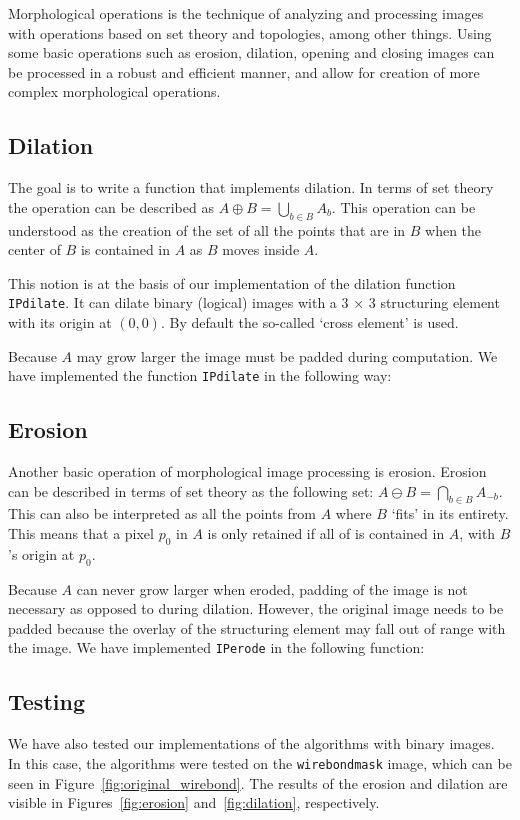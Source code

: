 Morphological operations is the technique of analyzing and processing images with operations based on set theory and topologies, among other things.
Using some basic operations such as erosion, dilation, opening and closing images can be processed in a robust and efficient manner, and allow for creation of more complex morphological operations.

\subsection{Dilation}
The goal is to write a function that implements dilation.
In terms of set theory the operation can be described as \(A \oplus B = \underset{b \in B}\bigcup A_b\).
This operation can be understood as the creation of the set of all the points that are in \(B\) when the center of \(B\) is contained in \(A\) as \(B\) moves inside \(A\).

This notion is at the basis of our implementation of the dilation function \texttt{IPdilate}.
It can dilate binary (logical) images with a 3 \(\times\) 3 structuring element with its origin at \((0, 0)\).
By default the so-called `cross element' is used.

Because \(A\) may grow larger the image must be padded during computation.
We have implemented the function \texttt{IPdilate} in the following way:
\subsection{Erosion}
Another basic operation of morphological image processing is erosion.
Erosion can be described in terms of set theory as the following set: \(A \ominus B = \underset{b \in B}\bigcap A_{-b}\).
This can also be interpreted as all the points from \(A\) where \(B\) `fits' in its entirety.
This means that a pixel \(p_0\) in \(A\) is only retained if all of is contained in \(A\), with \(B\)'s origin at \(p_0\).

Because \(A\) can never grow larger when eroded, padding of the image is not necessary as opposed to during dilation.
However, the original image needs to be padded because the overlay of the structuring element may fall out of range with the image.
We have implemented \texttt{IPerode} in the following function:
\clearpage
\subsection{Testing}
We have also tested our implementations of the algorithms with binary images.
In this case, the algorithms were tested on the \texttt{wirebondmask} image, which can be seen in Figure~\ref{fig:original_wirebond}.
The results of the erosion and dilation are visible in Figures~\ref{fig:erosion} and~\ref{fig:dilation}, respectively.

